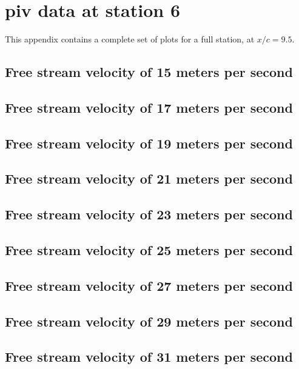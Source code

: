 

\chapter{piv data at station 6}
\label{appendix:station_6}

This appendix contains a complete set of plots for a full station, at $x/c=9.5$.


\section{Free stream velocity of 15 meters per second}

\section{Free stream velocity of 17 meters per second}

\section{Free stream velocity of 19 meters per second}

\section{Free stream velocity of 21 meters per second}

\section{Free stream velocity of 23 meters per second}

\section{Free stream velocity of 25 meters per second}

\section{Free stream velocity of 27 meters per second}

\section{Free stream velocity of 29 meters per second}

\section{Free stream velocity of 31 meters per second}

